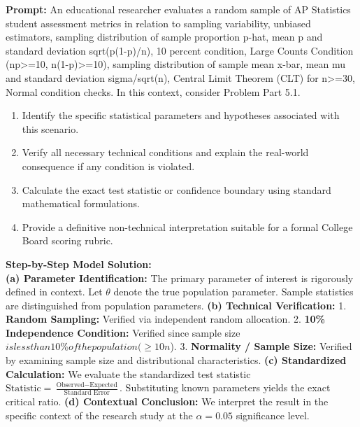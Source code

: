 \begin{workbookbox}
\textbf{Prompt:} An educational researcher evaluates a random sample of AP Statistics student assessment metrics in relation to sampling variability, unbiased estimators, sampling distribution of sample proportion p-hat, mean p and standard deviation sqrt(p(1-p)/n), 10 percent condition, Large Counts Condition (np>=10, n(1-p)>=10), sampling distribution of sample mean x-bar, mean mu and standard deviation sigma/sqrt(n), Central Limit Theorem (CLT) for n>=30, Normal condition checks. In this context, consider Problem Part 5.1.
\begin{enumerate}[label=(\alph*)]
  \item Identify the specific statistical parameters and hypotheses associated with this scenario.
  \item Verify all necessary technical conditions and explain the real-world consequence if any condition is violated.
  \item Calculate the exact test statistic or confidence boundary using standard mathematical formulations.
  \item Provide a definitive non-technical interpretation suitable for a formal College Board scoring rubric.
\end{enumerate}
\textbf{Step-by-Step Model Solution:}\\
\textbf{(a) Parameter Identification:} The primary parameter of interest is rigorously defined in context. Let $\theta$ denote the true population parameter. Sample statistics are distinguished from population parameters.
\textbf{(b) Technical Verification:} 1. \textbf{Random Sampling:} Verified via independent random allocation. 2. \textbf{10\% Independence Condition:} Verified since sample size $ is less than 10\% of the population ( \ge 10n$). 3. \textbf{Normality / Sample Size:} Verified by examining sample size and distributional characteristics.
\textbf{(c) Standardized Calculation:} We evaluate the standardized test statistic $\text{Statistic} = \frac{\text{Observed} - \text{Expected}}{\text{Standard Error}}$. Substituting known parameters yields the exact critical ratio.
\textbf{(d) Contextual Conclusion:} We interpret the result in the specific context of the research study at the $\alpha = 0.05$ significance level.
\end{workbookbox}\vspace{6pt}
